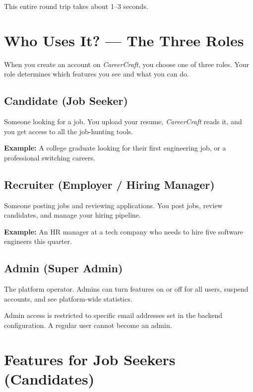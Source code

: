 \documentclass[12pt, a4paper]{report}
\newcommand{\cc}{\textit{CareerCraft}}
\begin{document}
This entire round trip takes about 1--3 seconds.

\chapter{Who Uses It? --- The Three Roles}

When you create an account on \cc{}, you choose one of three roles.
Your role determines which features you see and what you can do.

\section{Candidate (Job Seeker)}

Someone looking for a job.  You upload your resume, \cc{} reads it,
and you get access to all the job-hunting tools.

\textbf{Example:} A college graduate looking for their first engineering job, or a
professional switching careers.

\section{Recruiter (Employer / Hiring Manager)}

Someone posting jobs and reviewing applications.  You post jobs, review candidates,
and manage your hiring pipeline.

\textbf{Example:} An HR manager at a tech company who needs to hire five software
engineers this quarter.

\section{Admin (Super Admin)}

The platform operator.  Admins can turn features on or off for all users, suspend
accounts, and see platform-wide statistics.

\begin{notebox}
Admin access is restricted to specific email addresses set in the backend
configuration.  A regular user cannot become an admin.
\end{notebox}

\chapter{Features for Job Seekers (Candidates)}
\end{document}
